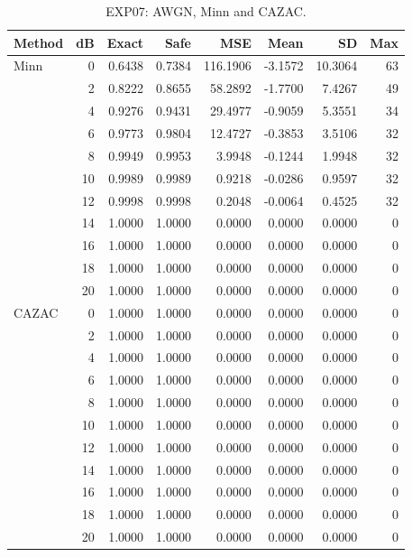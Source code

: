 \begin{table}[!p]
\centering
\caption{EXP07: AWGN, Minn and CAZAC.}
\label{app:exp07-0-1}
\small
\setlength{\tabcolsep}{3pt}
\renewcommand{\arraystretch}{1.05}
\begin{tabular}{lrrrrrrr}
\hline
Method & dB & Exact & Safe & MSE & Mean & SD & Max \\
\hline
Minn & 0 & 0.6438 & 0.7384 & 116.1906 & -3.1572 & 10.3064 & 63 \\
 & 2 & 0.8222 & 0.8655 & 58.2892 & -1.7700 & 7.4267 & 49 \\
 & 4 & 0.9276 & 0.9431 & 29.4977 & -0.9059 & 5.3551 & 34 \\
 & 6 & 0.9773 & 0.9804 & 12.4727 & -0.3853 & 3.5106 & 32 \\
 & 8 & 0.9949 & 0.9953 & 3.9948 & -0.1244 & 1.9948 & 32 \\
 & 10 & 0.9989 & 0.9989 & 0.9218 & -0.0286 & 0.9597 & 32 \\
 & 12 & 0.9998 & 0.9998 & 0.2048 & -0.0064 & 0.4525 & 32 \\
 & 14 & 1.0000 & 1.0000 & 0.0000 & 0.0000 & 0.0000 & 0 \\
 & 16 & 1.0000 & 1.0000 & 0.0000 & 0.0000 & 0.0000 & 0 \\
 & 18 & 1.0000 & 1.0000 & 0.0000 & 0.0000 & 0.0000 & 0 \\
 & 20 & 1.0000 & 1.0000 & 0.0000 & 0.0000 & 0.0000 & 0 \\
\hline
CAZAC & 0 & 1.0000 & 1.0000 & 0.0000 & 0.0000 & 0.0000 & 0 \\
 & 2 & 1.0000 & 1.0000 & 0.0000 & 0.0000 & 0.0000 & 0 \\
 & 4 & 1.0000 & 1.0000 & 0.0000 & 0.0000 & 0.0000 & 0 \\
 & 6 & 1.0000 & 1.0000 & 0.0000 & 0.0000 & 0.0000 & 0 \\
 & 8 & 1.0000 & 1.0000 & 0.0000 & 0.0000 & 0.0000 & 0 \\
 & 10 & 1.0000 & 1.0000 & 0.0000 & 0.0000 & 0.0000 & 0 \\
 & 12 & 1.0000 & 1.0000 & 0.0000 & 0.0000 & 0.0000 & 0 \\
 & 14 & 1.0000 & 1.0000 & 0.0000 & 0.0000 & 0.0000 & 0 \\
 & 16 & 1.0000 & 1.0000 & 0.0000 & 0.0000 & 0.0000 & 0 \\
 & 18 & 1.0000 & 1.0000 & 0.0000 & 0.0000 & 0.0000 & 0 \\
 & 20 & 1.0000 & 1.0000 & 0.0000 & 0.0000 & 0.0000 & 0 \\
\hline
\end{tabular}
\end{table}

